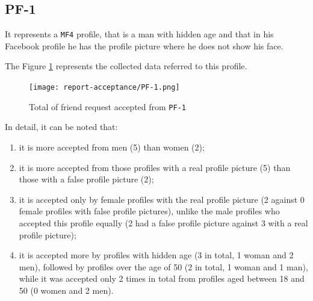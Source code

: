 \subsection*{PF-1}
It represents a \texttt{MF4} profile, that is a man with hidden age and that in his Facebook profile he has the profile picture where he does not show his face.
\par \noindent The Figure \ref{fig:accepted-from-PF1} represents the collected data referred to this profile. 
\begin{figure}[H]	
	\centering
	\texttt{[image: report-acceptance/PF-1.png]}
	\caption{Total of friend request accepted from \texttt{PF-1}}
	\label{fig:accepted-from-PF1}
\end{figure}
\par \noindent
In detail, it can be noted that:
\begin{enumerate}
	\item it is more accepted from men (5) than women (2);
	\item it is more accepted from those profiles with a real profile picture (5) than those with a false profile picture (2); 
	\item it is accepted only by female profiles with the real profile picture (2 against 0 female profiles with false profile pictures), unlike the male profiles who accepted this profile equally (2 had a false profile picture against 3 with a real profile picture);
	\item it is accepted more by profiles with hidden age (3 in total, 1 woman and 2 men), followed by profiles over the age of 50 (2 in total, 1 woman and 1 man), while it was accepted only 2 times in total from profiles aged between 18 and 50 (0 women and 2 men).
\end{enumerate}


